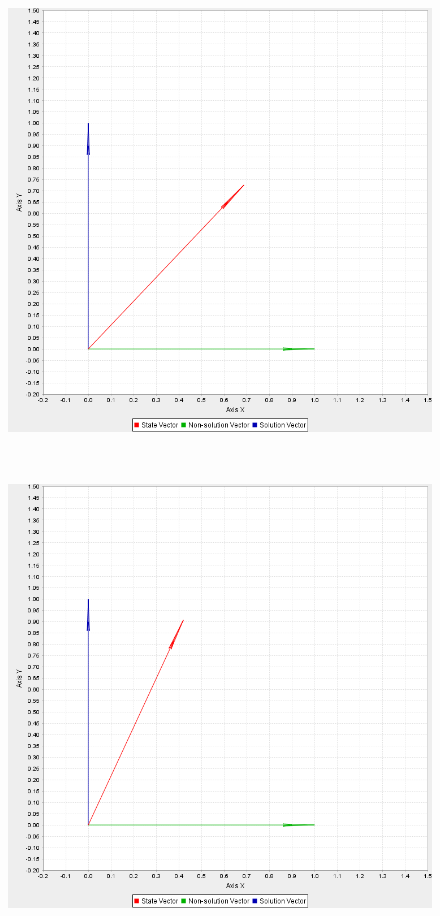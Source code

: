 \documentclass[bibliography=totocnumbered, 10pt]{article}
\theoremstyle{NoticeStyle}
\begin{document}
\begin{figure}[H]
\begin{minipage}{0.33\textwidth}
	\end{minipage}
	\begin{minipage}{0.33\textwidth}
		\includegraphics[width=\textwidth]{img/pic_6.png}
	\end{minipage}\\
	\begin{minipage}{0.33\textwidth}
		\includegraphics[width=\textwidth]{img/pic_9.png}

\end{minipage}
\end{figure}
\end{document}
